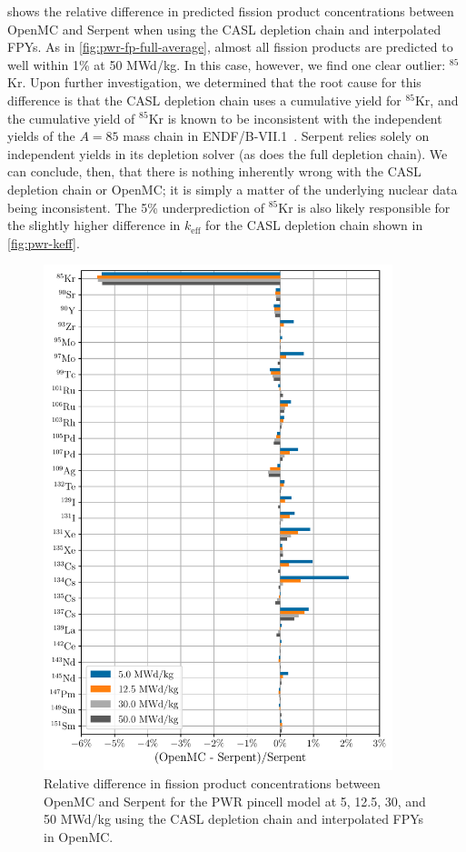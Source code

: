 \documentclass[3p,authoryear]{elsarticle}
\begin{document}
 shows the relative difference in predicted
fission product concentrations between OpenMC and Serpent when using the CASL
depletion chain and interpolated FPYs. As in \cref{fig:pwr-fp-full-average},
almost all fission products are predicted to well within 1\% at 50 MWd/kg. In
this case, however, we find one clear outlier: $^{85}$Kr. Upon further
investigation, we determined that the root cause for this difference is that the
CASL depletion chain uses a cumulative yield for $^{85}$Kr, and the cumulative
yield of $^{85}$Kr is known to be inconsistent with the independent yields of
the $A=85$ mass chain in ENDF/B-VII.1~\citep{pigni2015nds}. Serpent relies
solely on independent yields in its depletion solver (as does the full depletion
chain). We can conclude, then, that there is nothing inherently wrong with the
CASL depletion chain or OpenMC; it is simply a matter of the underlying nuclear
data being inconsistent. The 5\% underprediction of $^{85}$Kr is also likely
responsible for the slightly higher difference in $k_\text{eff}$ for the CASL
depletion chain shown in \cref{fig:pwr-keff}.
\begin{figure}[H]
  \centering
  \includegraphics[width=4in]{figures/pwr_fp_casl_average.pdf}
  \caption{Relative difference in fission product concentrations between OpenMC
  and Serpent for the PWR pincell model at 5, 12.5, 30, and 50 MWd/kg using the
  CASL depletion chain and interpolated FPYs in OpenMC.}
  \label{fig:pwr-fp-casl-average}
\end{figure}
\end{document}
